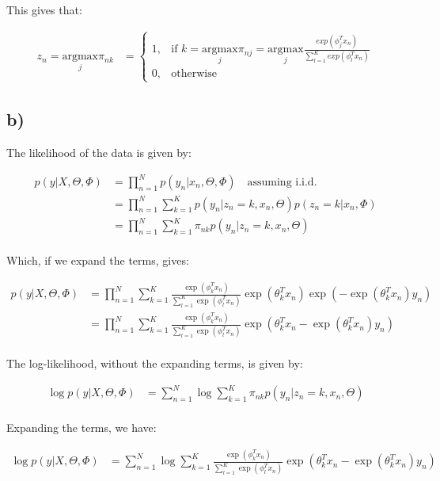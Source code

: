 \documentclass[12pt,a4paper,oneside]{paper}
\begin{document}
This gives that:

\begin{align*}
    z_n = \underset{j}{\mathrm{argmax}} \pi_{nk}
    &= \begin{cases}
        1, & \text{if } k = \underset{j}{\mathrm{argmax}} \pi_{nj} = \underset{j}{\mathrm{argmax}} \frac{exp(\phi_j^T x_n)}{\sum_{l=1}^{K} exp(\phi_l^T x_n)} \\
        0, & \text{otherwise}
    \end{cases}
\end{align*}

\subsection*{b)}

The likelihood of the data is given by:

\begin{align*}
    p(y | X, \Theta, \Phi) &= \prod_{n=1}^{N} p(y_n | x_n, \Theta, \Phi) \quad \text{assuming i.i.d.} \\
    &= \prod_{n=1}^{N} \sum_{k=1}^{K} p(y_n | z_n = k, x_n, \Theta) p(z_n = k | x_n, \Phi) \\
    &= \prod_{n=1}^{N} \sum_{k=1}^{K} \pi_{nk} p(y_n | z_n = k, x_n, \Theta) \\
\end{align*}

Which, if we expand the terms, gives:

\begin{align*}
    p(y | X, \Theta, \Phi) &= \prod_{n=1}^{N} \sum_{k=1}^{K} \frac{\exp(\phi_k^T x_n)}{\sum_{l=1}^{K} \exp(\phi_l^T x_n)} \exp(\theta_k^T x_n) \exp(-\exp(\theta_k^T x_n) y_n) \\
    &= \prod_{n=1}^{N} \sum_{k=1}^{K} \frac{\exp(\phi_k^T x_n)}{\sum_{l=1}^{K} \exp(\phi_l^T x_n)} \exp(\theta_k^T x_n -\exp(\theta_k^T x_n) y_n) \\
\end{align*}

The log-likelihood, without the expanding terms, is given by:

\begin{align*}
    \log p(y | X, \Theta, \Phi) &= \sum_{n=1}^{N} \log \sum_{k=1}^{K} \pi_{nk} p(y_n | z_n = k, x_n, \Theta) \\
\end{align*}

Expanding the terms, we have:

\begin{align*}
    \log p(y | X, \Theta, \Phi) &= \sum_{n=1}^{N} \log \sum_{k=1}^{K} \frac{\exp(\phi_k^T x_n)}{\sum_{l=1}^{K} \exp(\phi_l^T x_n)} \exp(\theta_k^T x_n -\exp(\theta_k^T x_n) y_n) \\
\end{align*}
\end{document}
